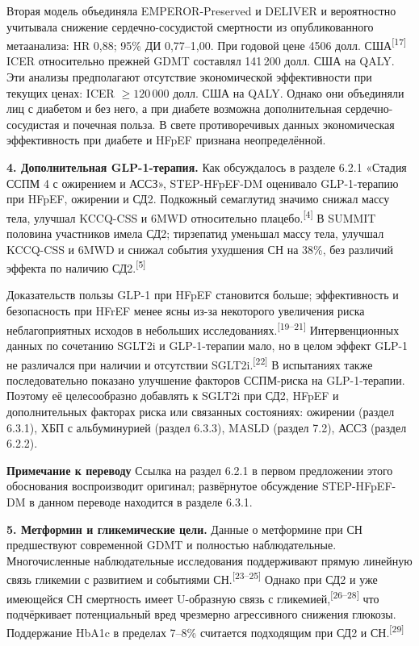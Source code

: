 \documentclass[11pt,a4paper]{article}
\newcommand{\src}[1]{\textsuperscript{[#1]}}
\newcommand{\editorial}[1]{\par\begingroup\small\color{black!70}\textbf{Примечание к переводу} #1\par\endgroup}
\begin{document}
Вторая модель объединяла EMPEROR-Preserved и DELIVER и вероятностно учитывала снижение сердечно-сосудистой смертности из опубликованного метаанализа: HR 0,88; 95\% ДИ 0,77--1,00. При годовой цене 4506 долл. США\src{17} ICER относительно прежней GDMT составлял 141\,200 долл. США на QALY. Эти анализы предполагают отсутствие экономической эффективности при текущих ценах: ICER $\geq120\,000$ долл. США на QALY. Однако они объединяли лиц с диабетом и без него, а при диабете возможна дополнительная сердечно-сосудистая и почечная польза. В свете противоречивых данных экономическая эффективность при диабете и HFpEF признана неопределённой.

\textbf{4. Дополнительная GLP-1-терапия.} Как обсуждалось в разделе 6.2.1 «Стадия ССПМ 4 с ожирением и АССЗ», STEP-HFpEF-DM оценивало GLP-1-терапию при HFpEF, ожирении и СД2. Подкожный семаглутид значимо снижал массу тела, улучшал KCCQ-CSS и 6MWD относительно плацебо.\src{4} В SUMMIT половина участников имела СД2; тирзепатид уменьшал массу тела, улучшал KCCQ-CSS и 6MWD и снижал события ухудшения СН на 38\%, без различий эффекта по наличию СД2.\src{5}

Доказательств пользы GLP-1 при HFpEF становится больше; эффективность и безопасность при HFrEF менее ясны из-за некоторого увеличения риска неблагоприятных исходов в небольших исследованиях.\src{19--21} Интервенционных данных по сочетанию SGLT2i и GLP-1-терапии мало, но в целом эффект GLP-1 не различался при наличии и отсутствии SGLT2i.\src{22} В испытаниях также последовательно показано улучшение факторов ССПМ-риска на GLP-1-терапии. Поэтому её целесообразно добавлять к SGLT2i при СД2, HFpEF и дополнительных факторах риска или связанных состояниях: ожирении (раздел 6.3.1), ХБП с альбуминурией (раздел 6.3.3), MASLD (раздел 7.2), АССЗ (раздел 6.2.2).
\editorial{Ссылка на раздел 6.2.1 в первом предложении этого обоснования воспроизводит оригинал; развёрнутое обсуждение STEP-HFpEF-DM в данном переводе находится в разделе 6.3.1.}

\textbf{5. Метформин и гликемические цели.} Данные о метформине при СН предшествуют современной GDMT и полностью наблюдательные. Многочисленные наблюдательные исследования поддерживают прямую линейную связь гликемии с развитием и событиями СН.\src{23--25} Однако при СД2 и уже имеющейся СН смертность имеет U-образную связь с гликемией,\src{26--28} что подчёркивает потенциальный вред чрезмерно агрессивного снижения глюкозы. Поддержание HbA1c в пределах 7--8\% считается подходящим при СД2 и СН.\src{29}
\end{document}

